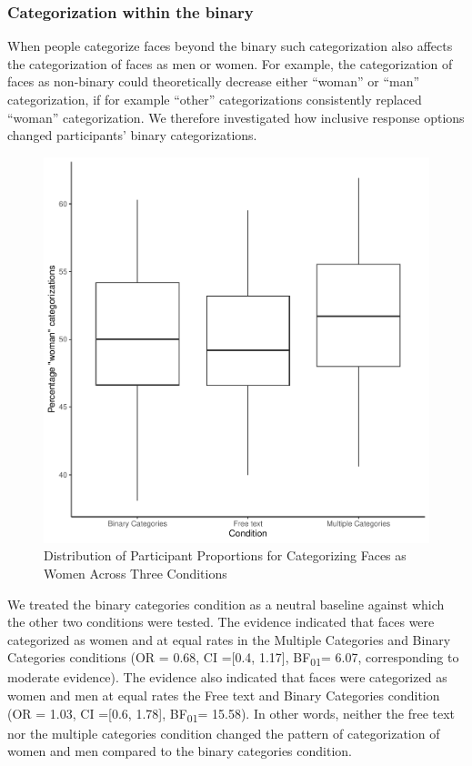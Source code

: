 \documentclass[
  man,
  longtable,
  nolmodern,
  notxfonts,
  notimes,
  colorlinks=true,linkcolor=blue,citecolor=blue,urlcolor=blue]{apa7}
\begin{document}
\subsubsection{Categorization within the
binary}\label{categorization-within-the-binary}

When people categorize faces beyond the binary such categorization also
affects the categorization of faces as men or women. For example, the
categorization of faces as non-binary could theoretically decrease
either ``woman'' or ``man'' categorization, if for example ``other''
categorizations consistently replaced ``woman'' categorization. We
therefore investigated how inclusive response options changed
participants' binary categorizations.

\begin{figure}[H]

\caption{Distribution of Participant Proportions for Categorizing Faces
as Women Across Three Conditions}

{\centering \includegraphics{quarto_test_files/figure-pdf/my-plot-1.pdf}

}

\end{figure}%

We treated the binary categories condition as a neutral baseline against
which the other two conditions were tested. The evidence indicated that
faces were categorized as women and at equal rates in the Multiple
Categories and Binary Categories conditions (OR = 0.68, CI ={[}0.4,
1.17{]}, BF\textsubscript{01}= 6.07, corresponding to moderate
evidence). The evidence also indicated that faces were categorized as
women and men at equal rates the Free text and Binary Categories
condition (OR = 1.03, CI ={[}0.6, 1.78{]}, BF\textsubscript{01}= 15.58).
In other words, neither the free text nor the multiple categories
condition changed the pattern of categorization of women and men
compared to the binary categories condition.
\end{document}
